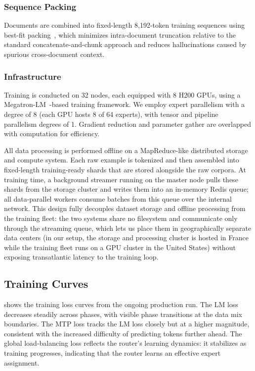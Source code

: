 \documentclass{llmxive}
\begin{document}
\subsubsection{Sequence Packing}

Documents are combined into fixed-length 8{,}192-token training sequences
using best-fit packing~\cite{ding2024bestfit}, which minimizes
intra-document truncation relative to the standard concatenate-and-chunk
approach and reduces hallucinations caused by spurious cross-document
context.

\subsubsection{Infrastructure}

Training is conducted on 32 nodes, each equipped with 8 H200 GPUs, using a
Megatron-LM~\cite{shoeybi2020megatronlm}-based training framework. We employ
expert parallelism with a degree of 8 (each GPU hosts 8 of 64 experts), with
tensor and pipeline parallelism degrees of 1. Gradient
reduction and parameter gather are overlapped with computation for efficiency.

All data processing is performed offline on a MapReduce-like distributed
storage and compute system. Each raw example is tokenized and then assembled
into fixed-length training-ready shards that are stored alongside the raw
corpora. At training time, a background streamer running on the master node
pulls these shards from the storage cluster and writes them into an in-memory
Redis queue; all data-parallel workers consume batches from this queue over
the internal network. This design fully decouples dataset storage and offline
processing from the training fleet: the two systems share no filesystem and
communicate only through the streaming queue, which lets us place them in
geographically separate data centers (in our setup, the storage and
processing cluster is hosted in France while the training fleet runs on a
GPU cluster in the United States) without exposing transatlantic latency to
the training loop.

\subsection{Training Curves}
\label{sec:training-curves}

 shows the training loss curves from the ongoing
production run. The LM loss decreases steadily across phases, with visible
phase transitions at the data mix boundaries. The MTP loss tracks the LM loss
closely but at a higher magnitude, consistent with the increased difficulty of
predicting tokens further ahead. The global load-balancing loss reflects the
router's learning dynamics: it stabilizes as training progresses, indicating
that the router learns an effective expert assignment.
\end{document}
